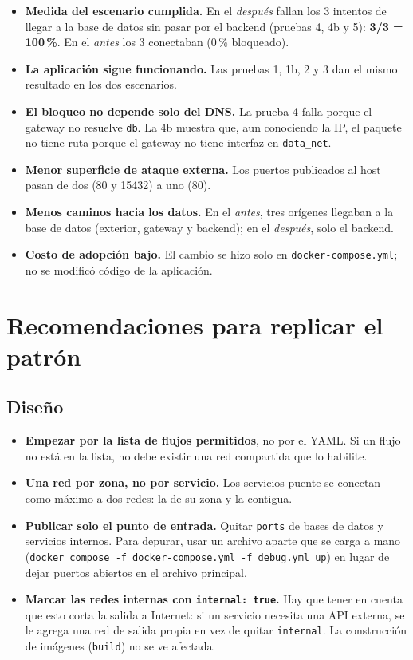 \documentclass[11pt,letterpaper]{article}
\newcommand{\code}[1]{\texttt{#1}}
\begin{document}
\begin{itemize}
  \item \textbf{Medida del escenario cumplida.} En el \emph{después} fallan los 3 intentos de llegar a la base de datos sin pasar por el backend (pruebas 4, 4b y 5): \textbf{3/3 = 100\,\%}. En el \emph{antes} los 3 conectaban (0\,\% bloqueado).
  \item \textbf{La aplicación sigue funcionando.} Las pruebas 1, 1b, 2 y 3 dan el mismo resultado en los dos escenarios.
  \item \textbf{El bloqueo no depende solo del DNS.} La prueba 4 falla porque el gateway no resuelve \code{db}. La 4b muestra que, aun conociendo la IP, el paquete no tiene ruta porque el gateway no tiene interfaz en \code{data\_net}.
  \item \textbf{Menor superficie de ataque externa.} Los puertos publicados al host pasan de dos (80 y 15432) a uno (80).
  \item \textbf{Menos caminos hacia los datos.} En el \emph{antes}, tres orígenes llegaban a la base de datos (exterior, gateway y backend); en el \emph{después}, solo el backend.
  \item \textbf{Costo de adopción bajo.} El cambio se hizo solo en \code{docker-compose.yml}; no se modificó código de la aplicación.
\end{itemize}

\section{Recomendaciones para replicar el patrón}

\subsection{Diseño}

\begin{itemize}
  \item \textbf{Empezar por la lista de flujos permitidos}, no por el YAML. Si un flujo no está en la lista, no debe existir una red compartida que lo habilite.
  \item \textbf{Una red por zona, no por servicio.} Los servicios puente se conectan como máximo a dos redes: la de su zona y la contigua.
  \item \textbf{Publicar solo el punto de entrada.} Quitar \code{ports} de bases de datos y servicios internos. Para depurar, usar un archivo aparte que se carga a mano (\code{docker compose -f docker-compose.yml -f debug.yml up}) en lugar de dejar puertos abiertos en el archivo principal.
  \item \textbf{Marcar las redes internas con \code{internal: true}.} Hay que tener en cuenta que esto corta la salida a Internet: si un servicio necesita una API externa, se le agrega una red de salida propia en vez de quitar \code{internal}. La construcción de imágenes (\code{build}) no se ve afectada.
\end{itemize}
\end{document}

